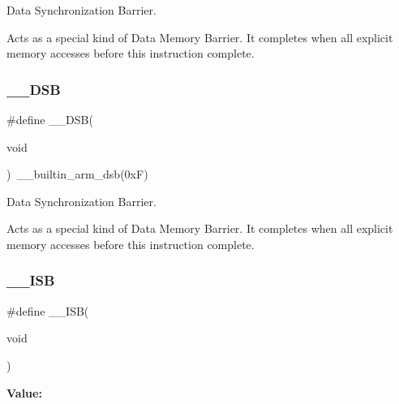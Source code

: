 Data Synchronization Barrier. 

Acts as a special kind of Data Memory Barrier. It completes when all explicit memory accesses before this instruction complete. \mbox{\label{group___c_m_s_i_s___core___instruction_interface_ga067d257a2b34565410acefb5afef2203}} 
\subsubsection{\texorpdfstring{\_\_DSB}{\_\_DSB}\hspace{0.1cm}{\footnotesize\ttfamily [3/3]}}
{\footnotesize\ttfamily \#define \+\_\+\+\_\+\+D\+SB(\begin{DoxyParamCaption}\item[{}]{void }\end{DoxyParamCaption})~\+\_\+\+\_\+builtin\+\_\+arm\+\_\+dsb(0x\+F)}



Data Synchronization Barrier. 

Acts as a special kind of Data Memory Barrier. It completes when all explicit memory accesses before this instruction complete. \mbox{\label{group___c_m_s_i_s___core___instruction_interface_gaad233022e850a009fc6f7602be1182f6}} 
\subsubsection{\texorpdfstring{\_\_ISB}{\_\_ISB}\hspace{0.1cm}{\footnotesize\ttfamily [1/3]}}
{\footnotesize\ttfamily \#define \+\_\+\+\_\+\+I\+SB(\begin{DoxyParamCaption}\item[{}]{void }\end{DoxyParamCaption})}

{\bfseries Value\+:}
\begin{DoxyCode}{0}
\DoxyCodeLine{\textcolor{keywordflow}{do} \{\(\backslash\)}

\end{DoxyCode}


